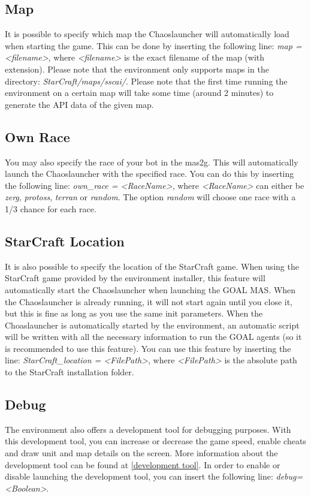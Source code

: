 \subsection{Map}
\label{map}
It is possible to specify which map the Chaoslauncher will automatically load when starting the game. This can be done by inserting the following line: \textit{map = <filename>}, where \textit{<filename>} is the exact filename of the map (with extension). Please note that the environment only supports maps in the directory: \textit{StarCraft/maps/sscai/}. Please note that the first time running the environment on a certain map will take some time (around 2 minutes) to generate the API data of the given map.

\subsection{Own Race}
\label{own race}
You may also specify the race of your bot in the mas2g. This will automatically launch the Chaoslauncher with the specified race. You can do this by inserting the following line: \textit{own\_race = <RaceName>}, where \textit{<RaceName>} can either be \textit{zerg}, \textit{protoss}, \textit{terran} or \textit{random}. The option \textit{random} will choose one race with a 1/3 chance for each race.

\subsection{StarCraft Location}
\label{StarCraft location}
It is also possible to specify the location of the StarCraft game. When using the StarCraft game provided by the environment installer, this feature will automatically start the Chaoslauncher when launching the GOAL MAS. When the Chaoslauncher is already running, it will not start again until you close it, but this is fine as long as you use the same init parameters. When the Choaslauncher is automatically started by the environment, an automatic script will be written with all the necessary information to run the GOAL agents (so it is recommended to use this feature). You can use this feature by inserting the line: \textit{StarCraft\_location = <FilePath>}, where \textit{<FilePath>} is the absolute path to the StarCraft installation folder.

\subsection{Debug}
\label{debug}
The environment also offers a development tool for debugging purposes. With this development tool, you can increase or decrease the game speed, enable cheats and draw unit and map details on the screen. More information about the development tool can be found at \ref{development tool}. In order to enable or disable launching the development tool, you can insert the following line: \textit{debug=<Boolean>}.

